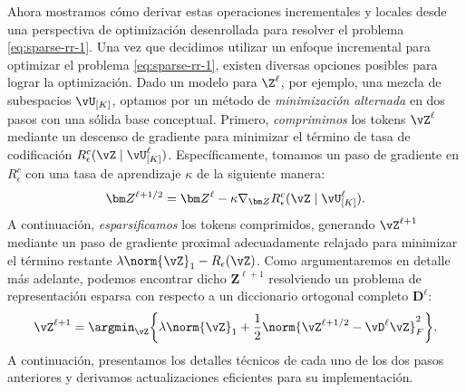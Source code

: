 \documentclass[../../book-main.tex]{subfiles}
\begin{document}
Ahora mostramos cómo derivar estas operaciones incrementales y locales
desde una perspectiva de optimización desenrollada para resolver el problema
\eqref{eq:sparse-rr-1}. Una vez que decidimos utilizar un enfoque incremental
para optimizar el problema
\eqref{eq:sparse-rr-1}, existen diversas opciones posibles para
lograr la optimización. Dado un modelo para $\Z^\ell$, por ejemplo, una mezcla
de subespacios $\vU_{[K]}$, optamos por un método de \textit{minimización
alternada} en dos pasos con una sólida base conceptual. Primero,
\textit{comprimimos} los tokens $\vZ^{\ell}$ mediante un descenso de gradiente para
minimizar el término de tasa de codificación $R^c_\epsilon (\vZ \mid
\vU_{[K]}^\ell)$. Específicamente, tomamos un paso de gradiente en
$R^c_\epsilon$ con una tasa de aprendizaje $\kappa$ de la siguiente manera:
\begin{align}\label{eq:Z l+1/2}
    \bm Z^{\ell+1/2} = \bm Z^\ell - \kappa \nabla_{\bm Z}
    R^c_\epsilon (\vZ \mid \vU_{[K]}^\ell).
\end{align}
A continuación, \textit{esparsificamos} los tokens comprimidos, generando
\(\vZ^{\ell + 1}\) mediante un paso de gradiente proximal adecuadamente relajado para
minimizar el término restante $\lambda \norm{\vZ}_{1} -
R_{\epsilon}(\vZ)$. Como argumentaremos en detalle más adelante, podemos encontrar
dicho $\bm Z^{\ell+1}$ resolviendo un problema de representación esparsa con
respecto a un diccionario ortogonal completo $\bm D^\ell$:
\begin{equation}\label{eq:Z l+1}
    \vZ^{\ell+1} = \argmin_{{\vZ}}  \bigg\{\lambda \norm{\vZ}_1 +
    \frac{1}{2}\norm{\vZ^{\ell + 1/2} - \vD^{\ell} {\vZ}}_F^2\bigg\}.
\end{equation}
A continuación, presentamos los detalles técnicos de cada uno de los dos
pasos anteriores y derivamos actualizaciones eficientes para su implementación.
\end{document}
